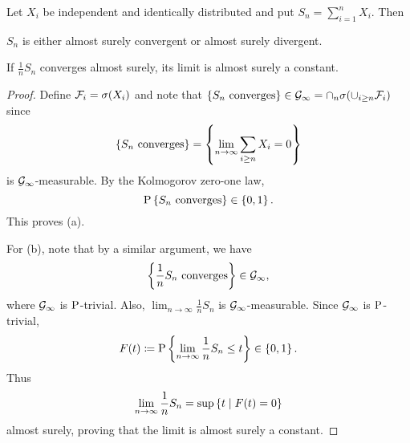 \begin{corollary}
    Let $X_i$ be independent and identically distributed and 
    put $S_n = \sum_{i=1}^n X_i$. Then 
    \begin{thmenum}
        \item $S_n$ is either almost surely convergent or almost surely divergent. 
        \item If $\frac{1}{n}S_n$ converges almost surely, its limit is almost surely 
        a constant. 
    \end{thmenum}
\end{corollary}
\begin{proof}
    Define $\F_i = \sigma(X_i)$ and note that $\set{S_n\text{ converges}}\in\G_{\infty} 
    = \cap_{n}\sigma(\cup_{i\geq n}\F_i)$ since 
    \begin{equation*}
        \set{S_n\text{ converges}} = \set{\lim_{n\to\infty}\sum_{i\geq n}X_i = 0}
    \end{equation*}
    is $\G_\infty$-measurable. By the Kolmogorov zero-one law, 
    \begin{equation*}
        \P\set{S_n\text{ converges}}\in\set{0,1}. 
    \end{equation*}
    This proves (a). 
    
    For (b), note that by a similar argument, we have 
    \begin{equation*}
        \set{\frac{1}{n}S_n\text{ converges}}\in\G_\infty,
    \end{equation*} 
    where $\G_\infty$ is $\P$-trivial. Also, $\lim_{n\to\infty}\frac{1}{n}S_n$ 
    is $\G_\infty$-measurable. Since $\G_\infty$ is $\P$-trivial, 
    \begin{equation*}
        F(t)\coloneq\P\set{\lim_{n\to\infty}\frac{1}{n}S_n\leq t} \in \set{0,1}. 
    \end{equation*}
    Thus 
    \begin{equation*}
        \lim_{n\to\infty}\frac{1}{n}S_n = \sup\Set{t}{F(t)= 0}
    \end{equation*}
    almost surely, proving that the limit is almost surely a constant. 
\end{proof}